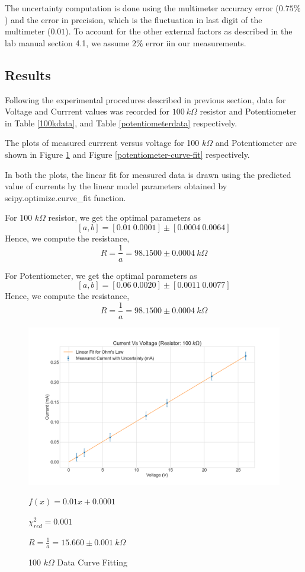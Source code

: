 \documentclass[letterpaper,12pt]{article}
\begin{document}
The uncertainty computation is done using the multimeter accuracy error ($0.75 \%$) and the error in 
precision, which is the fluctuation in last digit of the multimeter ($0.01$). To account for the other
external factors as described in the lab manual section 4.1\cite{lab-manual-ex1}, we assume $2\%$ error iin our measurements.

\subsection{Results}

Following the experimental procedures described in previous section, data for Voltage and Currrent values was recorded for 
$100\ k\Omega$ resistor and Potentiometer in Table \ref{100kdata}, and Table \ref{potentiometerdata} respectively.

The plots of measured currrent versus voltage for 100 $k\Omega$ and Potentiometer are shown in Figure \ref{100k-curve-fit}
and Figure \ref{potentiometer-curve-fit} respectively.

In both the plots, the linear fit for measured data is drawn using the predicted value of currents by the linear model  parameters
obtained by scipy.optimize.curve\_fit function.

For 100 $k\Omega$ resistor, we get the optimal parameters as
$$[a,b] = [0.01\ 0.0001] \pm [0.0004\ 0.0064]$$
Hence, we compute the resistance,
$$R = \frac{1}{a} = 98.1500 \pm 0.0004 \ k\Omega$$

For Potentiometer, we get the optimal parameters as
$$[a,b] = [0.06\ 0.0020] \pm [0.0011\ 0.0077]$$
Hence, we compute the resistance,
$$R = \frac{1}{a} = 98.1500 \pm 0.0004 \ k\Omega$$

\begin{figure}[H]
  \centering
  \includegraphics[width=0.95\linewidth]{../Exercise1/lab_1_ex_1_plot_100k.png}   
  \begin{center}
    $f(x) = 0.01 x + 0.0001 $
    
    $\chi^2_{red} = 0.001$

    $R = \frac{1}{a} = 15.660 \pm 0.001 \ k\Omega$
  \end{center}  
  \caption{100 $k\Omega$ Data Curve Fitting}
  \label{100k-curve-fit}
\end{figure}
\end{document}
